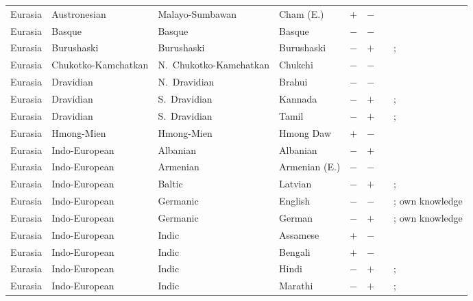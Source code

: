 \begin{landscape}
\begin{longtable}{l>{\raggedright\arraybackslash}p{2.2cm}>{\raggedright}p{2.5cm}>{\raggedright\arraybackslash}p{2.5cm}cc>{\raggedright\arraybackslash}p{3.4cm}>{\raggedright\arraybackslash}p{3.4cm}}
Eurasia & Austronesian & Malayo-Sumbawan & Cham (E.) & $+$ & $-$ & \citealt{Gil2013} & \citealt[passim]{Thurgood2005}\\
Eurasia & Basque & Basque & Basque & $-$ & $-$ & \citealt{Gil2013} & \citealt{Corbett2013}\\
Eurasia & Burushaski & Burushaski & Burushaski & $-$ & $+$ & \citealt{Gil2013} & \citealt{Corbett2013}; \citealt[161--167]{Munshi2006}\\
Eurasia & Chukotko-Kamchatkan & N.~Chukotko-Kamchatkan & Chukchi & $-$ & $-$ & \citealt{Gil2013} & \citealt{Corbett2013}\\
Eurasia & Dravidian & N.~Dravidian & Brahui & $-$ & $-$ & \citealt{Gil2013} & \citealt{Corbett2013}\\
Eurasia & Dravidian & S.~Dravidian & Kannada & $-$ & $+$ & \citealt{Gil2013} & \citealt{Corbett2013}; \citealt[221--222]{Sridhar1990}\\
Eurasia & Dravidian & S.~Dravidian & Tamil & $-$ & $+$ & \citealt[48--50]{Schiffman1999}& \citealt{Corbett2013}; \citealt[57--58]{Schiffman1999}\\
Eurasia & Hmong-Mien & Hmong-Mien & Hmong Daw & $+$ & $-$ & \citealt{Gil2013} & \citealt[297]{Nichols1992}\\
Eurasia & Indo-European & Albanian & Albanian & $-$ & $+$ & \citealt{Gil2013} & \citealt[17, 18, 29]{Matasovic2012a}\\
Eurasia & Indo-European & Armenian & Armenian (E.) & $-$ & $-$ & \citealt{Gil2013} & \citealt{Corbett2013}\\
Eurasia & Indo-European & Baltic & Latvian & $-$ & $+$ & \citealt{Gil2013} & \citealt{Corbett2013}; \citealt[66--73]{Kalnaca2014}\\
Eurasia & Indo-European & Germanic & English & $-$ & $-$ & \citealt{Gil2013} & \citealt{Corbett2013}; own knowledge\\
Eurasia & Indo-European & Germanic & German & $-$ & $+$ & \citealt{Gil2013} & \citealt{Corbett2013}; own knowledge\\
Eurasia & Indo-European & Indic & Assamese & $+$ & $-$ & \citealt{Gil2013} &  \citealt[415]{Goswami2003}\\
Eurasia & Indo-European & Indic & Bengali & $+$ & $-$ & \citealt{Gil2013} & \citealt[425]{Klaiman2009}\\
Eurasia & Indo-European & Indic & Hindi & $-$ & $+$ & \citealt{Gil2013} & \citealt{Corbett2013}; \citealt[1--22]{McGregor1986}\\
Eurasia & Indo-European & Indic & Marathi & $-$ & $+$ & \citealt{Gil2013} & \citealt{Corbett2013}; \citealt[702--707]{Pandharipande2003}\\

\end{longtable}
\end{landscape}
